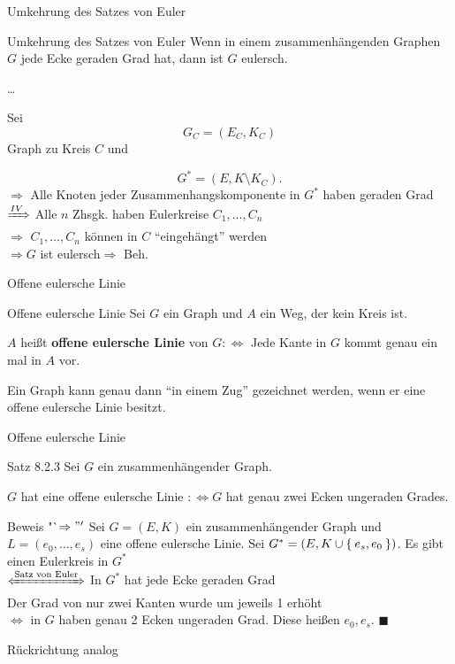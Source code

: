 \begin{frame}{Umkehrung des Satzes von Euler}
\begin{block}{Umkehrung des Satzes von Euler}
Wenn in einem zusammenhängenden Graphen $G$ jede Ecke geraden Grad hat, dann 
ist $G$ eulersch.
\end{block}
\dots

Sei
\[G_C = (E_C, K_C) \]
Graph zu Kreis $C$ und

\[G^* = (E, K \setminus K_C).\] \pause
$\Rightarrow$ Alle Knoten jeder Zusammenhangskomponente in $G^*$ haben geraden Grad\\
\pause
$\xRightarrow[]{IV}$ Alle $n$ Zhsgk. haben Eulerkreise $C_1, \dots, C_n$\\
\pause
$\Rightarrow$ $C_1, \dots, C_n$ können in $C$ \enquote{eingehängt} werden\\
\pause
$\Rightarrow G$ ist eulersch\pause $\Rightarrow $ Beh.
\end{frame}

\begin{frame}{Offene eulersche Linie}
\begin{block}{Offene eulersche Linie}
Sei $G$ ein Graph und $A$ ein Weg, der kein Kreis ist.

$A$ heißt \textbf{offene eulersche Linie} von $G :\Leftrightarrow$ Jede Kante 
in $G$ kommt genau ein mal in $A$ vor.
\end{block}

Ein Graph kann genau dann "`in einem Zug"' gezeichnet werden, wenn er eine 
offene eulersche Linie besitzt.
\end{frame}

\begin{frame}{Offene eulersche Linie}
\begin{block}{Satz 8.2.3}
Sei $G$ ein zusammenhängender Graph.

$G$ hat eine offene eulersche Linie $:\Leftrightarrow G$ hat genau zwei Ecken 
ungeraden Grades.
\end{block}

\pause

\begin{block}{Beweis "`$\Rightarrow"'$}
Sei $G=(E, K)$ ein zusammenhängender Graph und $L = (e_0, \dots, e_s)$ eine offene
eulersche Linie. \pause
Sei $G^* = (E, K \cup \Set{e_s, e_0})$. \pause
Es gibt einen Eulerkreis in $G^*$ \pause \\
$\xLeftrightarrow{\text{Satz von Euler}}$ In $G^*$ hat jede Ecke geraden Grad \pause \\
Der Grad von nur zwei Kanten wurde um jeweils 1 erhöht \pause \\
$\Leftrightarrow$ in $G$ haben genau 2 Ecken ungeraden Grad. Diese heißen $e_0, e_s$. $\blacksquare$
\end{block}

\pause
Rückrichtung analog
\end{frame}

